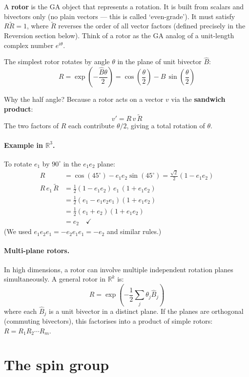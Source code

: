 \documentclass[11pt, twoside, openright]{memoir}
\newcommand{\rev}[1]{\widetilde{#1}} %
\begin{document}
A \textbf{rotor} is the GA object that represents a rotation. It is built from scalars and bivectors only (no plain vectors --- this is called `even-grade'). It must satisfy $R\widetilde{R} = 1$, where $\widetilde{R}$ reverses the order of all vector factors (defined precisely in the Reversion section below). Think of a rotor as the GA analog of a unit-length complex number $e^{i\theta}$.

The simplest rotor rotates by angle $\theta$ in the plane of unit
bivector $\hat{B}$:
\[
  R = \exp\!\left(-\frac{\hat{B}\theta}{2}\right)
    = \cos\!\left(\frac{\theta}{2}\right)
    - \hat{B}\,\sin\!\left(\frac{\theta}{2}\right)
\]

Why the half angle?  Because a rotor acts on a vector $v$ via the
\textbf{sandwich product}:
\[
  v' = R \, v \, \rev{R}
\]
The two factors of $R$ each contribute $\theta/2$, giving a total
rotation of $\theta$.

\paragraph{Example in $\mathbb{R}^3$.}
To rotate $e_1$ by $90^\circ$ in the $e_1 e_2$ plane:
\begin{align*}
  R &= \cos(45^\circ) - e_1 e_2 \sin(45^\circ)
     = \frac{\sqrt{2}}{2}(1 - e_1 e_2) \\
  R \, e_1 \, \rev{R}
    &= \frac{1}{2}(1 - e_1 e_2)\, e_1 \,(1 + e_1 e_2) \\
    &= \frac{1}{2}(e_1 - e_1 e_2 e_1)(1 + e_1 e_2) \\
    &= \frac{1}{2}(e_1 + e_2)(1 + e_1 e_2) \\
    &= e_2 \quad \checkmark
\end{align*}
(We used $e_1 e_2 e_1 = -e_2 e_1 e_1 = -e_2$ and similar rules.)

\paragraph{Multi-plane rotors.}
In high dimensions, a rotor can involve multiple independent rotation
planes simultaneously.  A general rotor in $\mathbb{R}^k$ is:
\[
  R = \exp\!\left(-\frac{1}{2}\sum_j \theta_j \hat{B}_j\right)
\]
where each $\hat{B}_j$ is a unit bivector in a distinct plane.
If the planes are orthogonal (commuting bivectors), this factorises
into a product of simple rotors:
$R = R_1 R_2 \cdots R_m$.

\section{The spin group}
\end{document}
